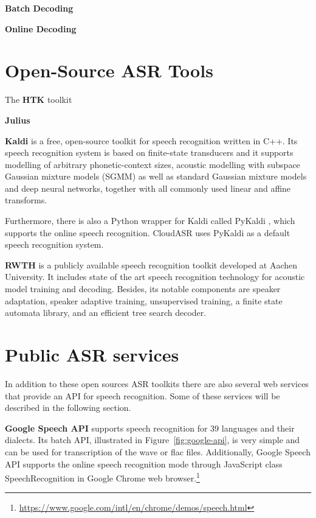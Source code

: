 \textbf{Batch Decoding}
\BLIND

\textbf{Online Decoding}
\BLIND


\section{Open-Source ASR Tools}


The \textbf{HTK} \cite{young1997htk} toolkit
\BLIND

\textbf{Julius} \cite{lee2001julius}
\BLIND

\textbf{Kaldi} \cite{povey2011kaldi} is a free, open-source toolkit for speech recognition written in C++.
Its speech recognition system is based on finite-state transducers
  and it supports modelling of arbitrary phonetic-context sizes,
  acoustic modelling with subspace Gaussian mixture models (SGMM)
  as well as standard Gaussian mixture models and deep neural networks,
  together with all commonly used linear and affine transforms.

Furthermore, there is also a Python wrapper for Kaldi called PyKaldi \cite{platek2014free},
  which supports the online speech recognition.
CloudASR uses PyKaldi as a default speech recognition system.

\textbf{RWTH} \cite{rybach2009rwth} is a publicly available speech recognition toolkit developed at Aachen University.
It includes state of the art speech recognition technology for acoustic model training and decoding.
Besides, its notable components are speaker adaptation,
  speaker adaptive training,
  unsupervised training,
  a finite state automata library,
  and an efficient tree search decoder.


\section{Public ASR services}
In addition to these open sources ASR toolkits
  there are also several web services that provide an API for speech recognition.
Some of these services will be described in the following section.

\textbf{Google Speech API} supports speech recognition for 39 languages and their dialects.
Its batch API, illustrated in Figure~\ref{fig:google-api}, is very simple and can be used for transcription of the wave or flac files.
Additionally,
  Google Speech API supports the online speech recognition mode through JavaScript class SpeechRecognition in Google Chrome web browser.\footnote{\url{https://www.google.com/intl/en/chrome/demos/speech.html}}

